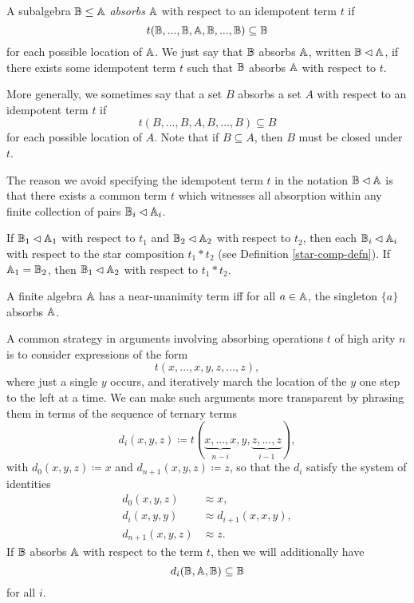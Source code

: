 \documentclass[letterpaper,11pt]{article}
\begin{document}
\begin{defn} A subalgebra $\mathbb{B} \le \mathbb{A}$ \emph{absorbs} $\mathbb{A}$ with respect to an idempotent term $t$ if
\[
t(\mathbb{B}, ..., \mathbb{B}, \mathbb{A}, \mathbb{B}, ..., \mathbb{B}) \subseteq \mathbb{B}
\]
for each possible location of $\mathbb{A}$. We just say that $\mathbb{B}$ absorbs $\mathbb{A}$, written $\mathbb{B} \lhd \mathbb{A}$, if there exists some idempotent term $t$ such that $\mathbb{B}$ absorbs $\mathbb{A}$ with respect to $t$.

More generally, we sometimes say that a set $B$ absorbs a set $A$ with respect to an idempotent term $t$ if
\[
t(B, ..., B, A, B, ..., B) \subseteq B
\]
for each possible location of $A$. Note that if $B \subseteq A$, then $B$ must be closed under $t$.
\end{defn}

The reason we avoid specifying the idempotent term $t$ in the notation $\mathbb{B} \lhd \mathbb{A}$ is that there exists a common term $t$ which witnesses all absorption within any finite collection of pairs $\mathbb{B}_i \lhd \mathbb{A}_i$.

\begin{prop} If $\mathbb{B}_1 \lhd \mathbb{A}_1$ with respect to $t_1$ and $\mathbb{B}_2 \lhd \mathbb{A}_2$ with respect to $t_2$, then each $\mathbb{B}_i \lhd \mathbb{A}_i$ with respect to the star composition $t_1*t_2$ (see Definition \ref{star-comp-defn}). If $\mathbb{A}_1 = \mathbb{B}_2$, then $\mathbb{B}_1 \lhd \mathbb{A}_2$ with respect to $t_1*t_2$.
\end{prop}

\begin{cor} A finite algebra $\mathbb{A}$ has a near-unanimity term iff for all $a \in \mathbb{A}$, the singleton $\{a\}$ absorbs $\mathbb{A}$.
\end{cor}

A common strategy in arguments involving absorbing operations $t$ of high arity $n$ is to consider expressions of the form
\[
t(x,...,x,y,z,...,z),
\]
where just a single $y$ occurs, and iteratively march the location of the $y$ one step to the left at a time. We can make such arguments more transparent by phrasing them in terms of the sequence of ternary terms
\[
d_i(x,y,z) \coloneqq t(\underbrace{x,...,x}_{n-i},y,\underbrace{z,...,z}_{i-1}),
\]
with $d_0(x,y,z) \coloneqq x$ and $d_{n+1}(x,y,z) \coloneqq z$, so that the $d_i$ satisfy the system of identities
\begin{align*}
d_0(x,y,z) &\approx x,\\
d_i(x,y,y) &\approx d_{i+1}(x,x,y),\\
d_{n+1}(x,y,z) &\approx z.
\end{align*}
If $\mathbb{B}$ absorbs $\mathbb{A}$ with respect to the term $t$, then we will additionally have
\[
d_i(\mathbb{B},\mathbb{A},\mathbb{B}) \subseteq \mathbb{B}
\]
for all $i$.
\end{document}
